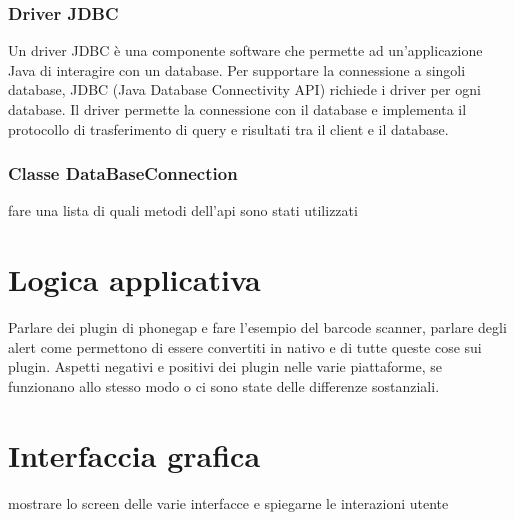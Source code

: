 \subsubsection{Driver JDBC}

Un driver JDBC è una componente software che permette ad un'applicazione Java di interagire con un database. Per supportare la connessione a singoli database, JDBC (Java Database Connectivity API) richiede i driver per ogni database. Il driver permette la connessione con il database e implementa il protocollo di trasferimento di query e risultati tra il client e il database.

\subsubsection{Classe DataBaseConnection}

fare una lista di quali metodi dell'api sono stati utilizzati

\section{Logica applicativa}

Parlare dei plugin di phonegap e fare l'esempio del barcode scanner, parlare degli alert come permettono di essere convertiti in nativo e di tutte queste cose sui plugin. Aspetti negativi e positivi dei plugin nelle varie piattaforme, se funzionano allo stesso modo o ci sono state delle differenze sostanziali.

\section{Interfaccia grafica}

mostrare lo screen delle varie interfacce e spiegarne le interazioni utente
